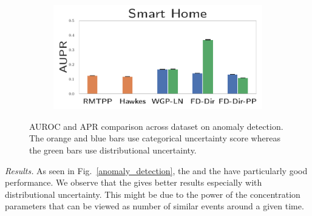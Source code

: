 \begin{figure}
\begin{subfigure}{0.25\textwidth}
    \end{subfigure}%
    \begin{subfigure}{0.25\textwidth}
        \centering
        \includegraphics[width=\linewidth]{sections/010_neurips2019/paper/images/uncertainty-apr-kast-home.pdf}
    \end{subfigure}
    \caption{AUROC and APR comparison across dataset on anomaly detection. The orange and blue bars use categorical uncertainty score whereas the green bars use distributional uncertainty.}
    \label{fig:anomaly_detection}
    \vspace{-0.5cm}
\end{figure}

\textit{Results.} As seen in Fig.\ \ref{anomaly_detection}, the \DirModel and the \GPModel have particularly good performance. We observe that the \DirModel gives better results especially with distributional uncertainty. This might be due to the power of the concentration parameters that can be viewed as number of similar events around a given time.